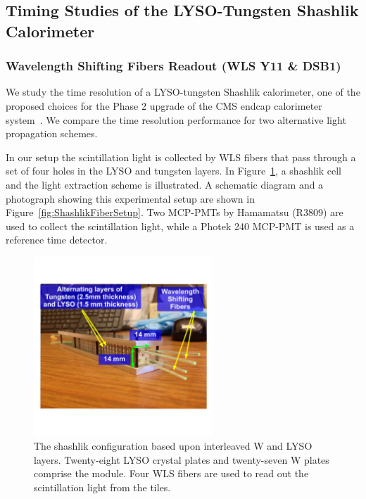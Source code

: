 \subsection{Timing Studies of the LYSO-Tungsten Shashlik Calorimeter}
\subsubsection{Wavelength Shifting Fibers Readout (WLS Y11 \& DSB1)}
We study the time resolution of a LYSO-tungsten Shashlik calorimeter, one of the
proposed choices for the Phase 2 upgrade of the CMS endcap calorimeter
system~\cite{Contardo:1605208}. We compare the time resolution performance for
two alternative light propagation schemes. 

In our setup the scintillation light is collected by WLS fibers that
pass through a set of four holes in the LYSO and tungsten layers. In 
Figure~\ref{fig:ShashlikDiagram}, a shashlik cell and the light extraction 
scheme is illustrated. A schematic diagram and a photograph showing this experimental
setup are shown in Figure~\ref{fig:ShashlikFiberSetup}. Two MCP-PMTs  by 
Hamamatsu (R3809) are used to collect the scintillation light, while a Photek 240 
MCP-PMT is used as a reference time detector. 

\begin{figure}[H] \centering
\includegraphics[width=0.6\textwidth]{figs/timing/ShashlikCellPhoto.pdf} 
\caption{ The shashlik configuration based upon interleaved W and LYSO layers. 
Twenty-eight LYSO crystal plates and twenty-seven W plates comprise the module.
Four WLS fibers are used to read out the scintillation light from the 
tiles. } 
\label{fig:ShashlikDiagram}
\end{figure}

